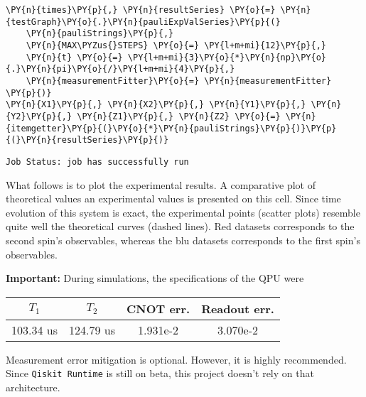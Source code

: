     \begin{tcolorbox}[breakable, size=fbox, boxrule=1pt, pad at break*=1mm,colback=cellbackground, colframe=cellborder]
\begin{Verbatim}[commandchars=\\\{\}]
\PY{n}{times}\PY{p}{,} \PY{n}{resultSeries} \PY{o}{=} \PY{n}{testGraph}\PY{o}{.}\PY{n}{pauliExpValSeries}\PY{p}{(}
    \PY{n}{pauliStrings}\PY{p}{,}
    \PY{n}{MAX\PYZus{}STEPS} \PY{o}{=} \PY{l+m+mi}{12}\PY{p}{,}
    \PY{n}{t} \PY{o}{=} \PY{l+m+mi}{3}\PY{o}{*}\PY{n}{np}\PY{o}{.}\PY{n}{pi}\PY{o}{/}\PY{l+m+mi}{4}\PY{p}{,}
    \PY{n}{measurementFitter}\PY{o}{=} \PY{n}{measurementFitter}
\PY{p}{)}
\PY{n}{X1}\PY{p}{,} \PY{n}{X2}\PY{p}{,} \PY{n}{Y1}\PY{p}{,} \PY{n}{Y2}\PY{p}{,} \PY{n}{Z1}\PY{p}{,} \PY{n}{Z2} \PY{o}{=} \PY{n}{itemgetter}\PY{p}{(}\PY{o}{*}\PY{n}{pauliStrings}\PY{p}{)}\PY{p}{(}\PY{n}{resultSeries}\PY{p}{)}
\end{Verbatim}
\end{tcolorbox}

    \begin{Verbatim}[commandchars=\\\{\}]
Job Status: job has successfully run
    \end{Verbatim}

    What follows is to plot the experimental results. A comparative plot of
theoretical values an experimental values is presented on this cell.
Since time evolution of this system is exact, the experimental points
(scatter plots) resemble quite well the theoretical curves (dashed
lines). Red datasets corresponds to the second spin's observables,
whereas the blu datasets corresponds to the first spin's observables.

\textbf{Important:} During simulations, the specifications of the QPU
were

\begin{longtable}[]{@{}cccc@{}}
\toprule
\(T_1\) & \(T_2\) & CNOT err. & Readout err. \\
\midrule
\endhead
103.34 us & 124.79 us & 1.931e-2 & 3.070e-2 \\
\bottomrule
\end{longtable}

Measurement error mitigation is optional. However, it is highly
recommended. Since \texttt{Qiskit\ Runtime} is still on beta, this
project doesn't rely on that architecture.

